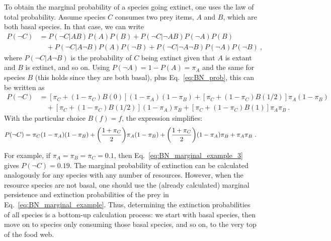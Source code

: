 \documentclass[11pt]{article}
\let\originalleft\left
\let\originalright\right
\renewcommand{\left}{\mathopen{}\mathclose\bgroup\originalleft}
\renewcommand{\right}{\aftergroup\egroup\originalright}
\begin{document}
To obtain the marginal probability of a species going extinct, one uses the law of total probability. Assume species $C$ consumes two prey items, $A$ and $B$, which are both basal species. In that case, we can write
\begin{equation}
  \label{eq:BN_marginal_example}
  \begin{split}
    P(\neg C) &= P(\neg C|A B)P(A)P(B) + P(\neg C|\neg A B)P(\neg A)P(B)
    \\ &\quad + P(\neg C|A \neg B)P(A)P(\neg B) + P(\neg C|\neg A \neg B)
    P(\neg A)P(\neg B) \ ,
  \end{split}
\end{equation}
where $P(\neg C|A \neg B)$ is the probability of $C$ being extinct given that $A$ is extant and $B$ is extinct, and so on. Using $P(\neg A) = 1 - P(A) = \pi_A$ and the same for species $B$ (this holds since they are both basal), plus Eq.~\ref{eq:BN_prob}, this can be written as
\begin{equation}
  \label{eq:BN_marginal_example_2}
  \begin{split}
    P(\neg C) &= [\pi_C + (1 - \pi_C) B(0)] (1 - \pi_A) (1 - \pi_B) +
    [\pi_C + (1 - \pi_C) B(1/2)] \pi_A (1 - \pi_B) \\ &\quad +
    [\pi_C + (1 - \pi_C) B(1/2)] (1 - \pi_A) \pi_B +
    [\pi_C + (1 - \pi_C) B(1)] \pi_A \pi_B \ .
  \end{split}
\end{equation}
With the particular choice $B(f)=f$, the expression simplifies:
\begin{equation}
  \label{eq:BN_marginal_example_3}
  P(\neg C) = \pi_C (1 - \pi_A) (1 - \pi_B) +
  \left( \frac{1 + \pi_C}{2} \right) \pi_A (1 - \pi_B) +
  \left( \frac{1 + \pi_C}{2} \right) (1 - \pi_A) \pi_B + \pi_A \pi_B \ .
\end{equation}

For example, if $\pi_A = \pi_B = \pi_C = 0.1$, then Eq.~\ref{eq:BN_marginal_example_3} gives $P(\neg C) = 0.19$. The marginal probability of extinction can be calculated analogously for any species with any number of resources. However, when the resource species are not basal, one should use the (already calculated) marginal persistence and extinction probabilities of the prey in Eq.~\ref{eq:BN_marginal_example}. Thus, determining the extinction probabilities of all species is a bottom-up calculation process: we start with basal species, then move on to species only consuming those basal species, and so on, to the very top of the food web.
\end{document}
